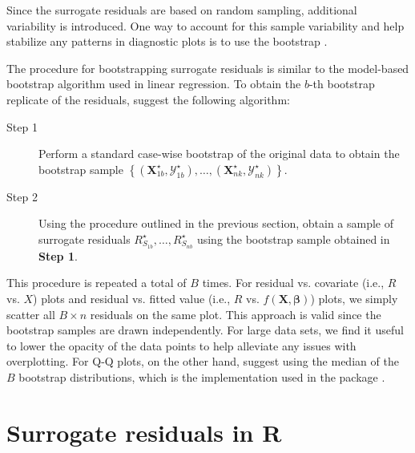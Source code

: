 Since the surrogate residuals are based on random sampling, additional variability is introduced. One way to account for this sample variability and help stabilize any patterns in diagnostic plots is to use the bootstrap \citep{efron-another-1979}.

The procedure for bootstrapping surrogate residuals is similar to the model-based bootstrap algorithm used in linear regression. To obtain the $b$-th bootstrap replicate of the residuals, \citet{residuals-liu-2017} suggest the following algorithm:
\begin{description}
  \item[Step 1] Perform a standard case-wise bootstrap of the original data to obtain the bootstrap sample $\left\{\left(\boldsymbol{X}_{1b}^\star, \mathcal{Y}_{1b}^\star\right), \dots, \left(\boldsymbol{X}_{ nk}^\star, \mathcal{Y}_{nk}^\star\right)\right\}$.
  \item[Step 2] Using the procedure outlined in the previous section, obtain a sample of surrogate residuals $R_{S_{1b}}^\star, \dots, R_{S_{nb}}^\star$ using the bootstrap sample obtained in \textbf{Step 1}.
\end{description}

This procedure is repeated a total of $B$ times. For residual vs. covariate (i.e., $R$ vs. $X$) plots and residual vs. fitted value (i.e., $R$ vs. $f\left(\boldsymbol{X}, \boldsymbol{\beta}\right)$) plots, we simply scatter all $B \times n$ residuals on the same plot. This approach is valid since the bootstrap samples are drawn independently. For large data sets, we find it useful to lower the opacity of the data points to help alleviate any issues with overplotting. For Q-Q plots, on the other hand, \citet{residuals-liu-2017} suggest using the median of the $B$ bootstrap distributions, which is the implementation used in the  package \citep{pkg-sure}.


\section{Surrogate residuals in R}

